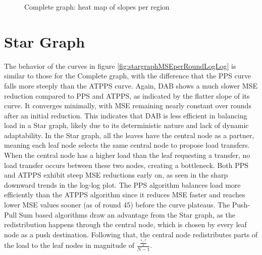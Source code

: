 \begin{figure}
    \centering
    \caption{Complete graph: heat map of slopes per region}
    \label{fig:completegrapslopes}
\end{figure}

\section{Star Graph}\label{sec:stargraph}
The behavior of the curves in figure \ref{fig:stargraphMSEperRoundLogLog} is similar to those for the Complete graph, with the difference that the PPS curve falls more steeply than the ATPPS curve. Again, DAB shows a much slower MSE reduction compared to PPS and ATPPS, as indicated by the flatter slope of its curve. It converges minimally, with MSE remaining nearly constant over rounds after an initial reduction. This indicates that DAB is less efficient in balancing load in a Star graph, likely due to its deterministic nature and lack of dynamic adaptability. In the Star graph, all the leaves have the central node as a partner, meaning each leaf node selects the same central node to propose load transfers. When the central node has a higher load than the leaf requesting a transfer, no load transfer occurs between these two nodes, creating a bottleneck. Both PPS and ATPPS exhibit steep MSE reductions early on, as seen in the sharp downward trends in the log-log plot. The PPS algorithm balances load more efficiently than the ATPPS algorithm since it reduces MSE faster and reaches lower MSE values sooner (as of round 45) before the curve plateaus. The Push-Pull Sum based algorithms draw an advantage from the Star graph, as the redistribution happens through the central node, which is chosen by every leaf node as a push destination. Following that, the central node redistributes parts of the load to the leaf nodes in magnitude of $\frac{\frac{s_i,r}{2}}{N-1}$.

